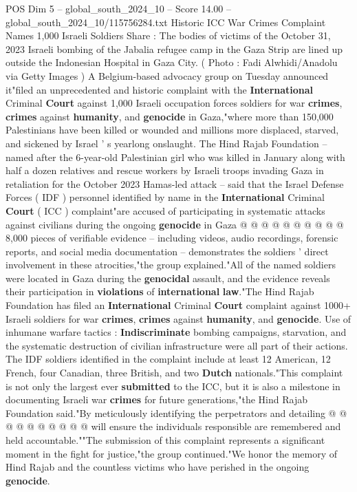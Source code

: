 \begin{textsample}{POS Dim 5 – global\_south\_2024\_10 – Score 14.00 – global\_south\_2024\_10/115756284.txt}  \label{ex:f5_pos_329}
Historic ICC War Crimes Complaint Names 1,000 Israeli Soldiers Share : The bodies of victims of the October 31, 2023 Israeli bombing of the Jabalia refugee camp in the Gaza Strip are lined up outside the Indonesian Hospital in Gaza City. ( Photo : Fadi Alwhidi/Anadolu via Getty Images ) A Belgium-based advocacy group on Tuesday announced it"filed an unprecedented and historic complaint with the \textbf{International} Criminal \textbf{Court} against 1,000 Israeli occupation forces soldiers for war \textbf{crimes}, \textbf{crimes} against \textbf{humanity}, and \textbf{genocide} in Gaza,"where more than 150,000 Palestinians have been killed or wounded and millions more displaced, starved, and sickened by Israel ' s yearlong onslaught.
The Hind Rajab Foundation -- named after the 6-year-old Palestinian girl who was killed in January along with half a dozen relatives and rescue workers by Israeli troops invading Gaza in retaliation for the October 2023 Hamas-led attack -- said that the Israel Defense Forces ( IDF ) personnel identified by name in the \textbf{International} Criminal \textbf{Court} ( ICC ) complaint"are accused of participating in systematic attacks against civilians during the ongoing \textbf{genocide} in Gaza @ @ @ @ @ @ @ @ @ @ 8,000 pieces of verifiable evidence -- including videos, audio recordings, forensic reports, and social media documentation -- demonstrates the soldiers ' direct involvement in these atrocities,"the group explained."All of the named soldiers were located in Gaza during the \textbf{genocidal} assault, and the evidence reveals their participation in \textbf{violations} of \textbf{international} \textbf{law}."The Hind Rajab Foundation has filed an \textbf{International} Criminal \textbf{Court} complaint against 1000+ Israeli soldiers for war \textbf{crimes}, \textbf{crimes} against \textbf{humanity}, and \textbf{genocide}.
Use of inhumane warfare tactics : \textbf{Indiscriminate} bombing campaigns, starvation, and the systematic destruction of civilian infrastructure were all part of their actions.
The IDF soldiers identified in the complaint include at least 12 American, 12 French, four Canadian, three British, and two \textbf{Dutch} nationals."This complaint is not only the largest ever \textbf{submitted} to the ICC, but it is also a milestone in documenting Israeli war \textbf{crimes} for future generations,"the Hind Rajab Foundation said."By meticulously identifying the perpetrators and detailing @ @ @ @ @ @ @ @ @ @ will ensure the individuals responsible are remembered and held accountable.""The submission of this complaint represents a significant moment in the fight for justice,"the group continued."We honor the memory of Hind Rajab and the countless victims who have perished in the ongoing \textbf{genocide}.

\end{textsample}

